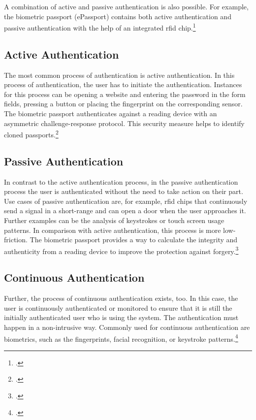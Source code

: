 A combination of active and passive authentication is also possible. For example, the biometric passport (\frqq ePassport\flqq) contains both active authentication and passive authentication with the help of an integrated \gls{rfid} chip.\footcite[See][545]{eckert-it-sec-9}


\subsection{Active Authentication}
\label{subsec:active_auth}

The most common process of authentication is active authentication. In this process of authentication, the user has to initiate the authentication. Instances for this process can be opening a website and entering the password in the form fields, pressing a button or placing the fingerprint on the corresponding sensor. The biometric passport authenticates against a reading device with an asymmetric challenge-response protocol. This security measure helps to identify cloned passports.\footcites[See][185--186]{10.1007/978-3-319-05452-0_14} [See][545]{eckert-it-sec-9}

\subsection{Passive Authentication}

In contrast to the active authentication process, in the passive authentication process the user is authenticated without the need to take action on their part. Use cases of passive authentication are, for example, \gls{rfid} chips that continuously send a signal in a short-range and can open a door when the user approaches it. Further examples can be the analysis of keystrokes or touch screen usage patterns. In comparison with active authentication, this process is more low-friction. The biometric passport provides a way to calculate the integrity and authenticity from a reading device to improve the protection against forgery.\footcites[See][186]{10.1007/978-3-319-05452-0_14}[See][]{185306}[See][545]{eckert-it-sec-9}

\subsection{Continuous Authentication}

Further, the process of continuous authentication exists, too. In this case, the user is continuously authenticated or monitored to ensure that it is still the initially authenticated user who is using the system. The authentication must happen in a non-intrusive way. Commonly used for continuous authentication are biometrics, such as the fingerprints, facial recognition, or keystroke patterns.\footcites[See][236--238]{dasgupta2017multi}[See][]{7444124}

